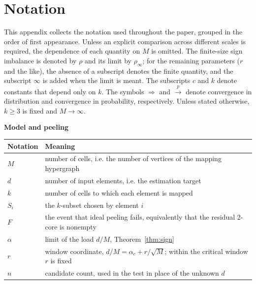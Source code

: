 \section{Notation}\label{app:notation}
This appendix collects the notation used throughout the paper, grouped in the order of first
appearance. Unless an explicit comparison across different scales is required, the dependence
of each quantity on $M$ is omitted. The finite-size sign imbalance is denoted by $\rho$ and its
limit by $\rho_\infty$; for the remaining parameters ($r$ and the like), the absence of a
subscript denotes the finite quantity, and the subscript $\infty$ is added when the limit is
meant. The subscripts $c$ and $k$ denote constants that depend only on $k$. The symbols
$\Rightarrow$ and $\xrightarrow p$ denote convergence in distribution and convergence in
probability, respectively. Unless stated otherwise, $k\ge3$ is fixed and $M\to\infty$.

\newcommand{\notationtable}[2]{%
\par\smallskip\noindent\textbf{#1}\par\nopagebreak\smallskip
{\small\noindent\begin{tabular}{@{}p{.22\linewidth}p{.74\linewidth}@{}}
\toprule
Notation & Meaning\\
\midrule
#2
\bottomrule
\end{tabular}}\par\medskip}

\notationtable{Model and peeling}{
$M$ & number of cells, i.e. the number of vertices of the mapping hypergraph\\
$d$ & number of input elements, i.e. the estimation target\\
$k$ & number of cells to which each element is mapped\\
$S_i$ & the $k$-subset chosen by element $i$\\
$F$ & the event that ideal peeling fails, equivalently that the residual 2-core is nonempty\\
$\alpha$ & limit of the load $d/M$, Theorem~\ref{thm:sign}\\
$r$ & window coordinate, $d/M=\alpha_c+r/\sqrt M$; within the critical window $r$ is fixed\\
$n$ & candidate count, used in the test in place of the unknown $d$\\
}

